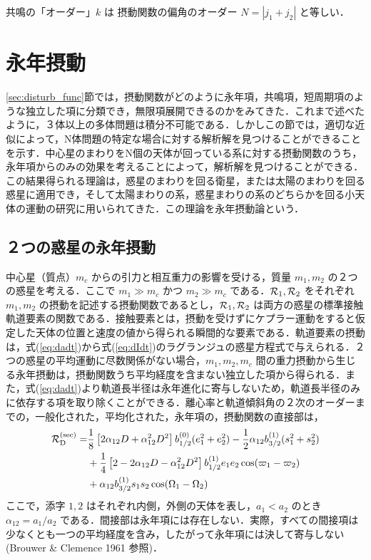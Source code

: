 \documentclass[11pt,a4paper,oneside,onecolumn]{jreport}
\begin{document}
共鳴の「オーダー」$k$ は 摂動関数の偏角のオーダー $N = |j_1 + j_2|$ と等しい．

\section{永年摂動}
\ref{sec:disturb_func}節では，摂動関数がどのように永年項，共鳴項，短周期項のような独立した項に分類でき，無限項展開できるのかをみてきた．これまで述べたように，３体以上の多体問題は積分不可能である．しかしこの節では，適切な近似によって，N体問題の特定な場合に対する解析解を見つけることができることを示す．中心星のまわりをN個の天体が回っている系に対する摂動関数のうち，永年項からのみの効果を考えることによって，解析解を見つけることができる．この結果得られる理論は，惑星のまわりを回る衛星，または太陽のまわりを回る惑星に適用でき，そして太陽まわりの系，惑星まわりの系のどちらかを回る小天体の運動の研究に用いられてきた．この理論を永年摂動論という．

\subsection{２つの惑星の永年摂動 \label{sec:2planet}}
中心星（質点）$m_c$ からの引力と相互重力の影響を受ける，質量 $m_1, m_2$ の２つの惑星を考える．ここで $m_1 \gg m_c$ かつ $m_2 \gg m_c$ である．${\cal R}_1, {\cal R}_2$ をそれぞれ $m_1, m_2$ の摂動を記述する摂動関数であるとし，${\cal R}_1, {\cal R}_2$ は両方の惑星の標準接触軌道要素の関数である．接触要素とは，摂動を受けずにケプラー運動をすると仮定した天体の位置と速度の値から得られる瞬間的な要素である．軌道要素の摂動は，式(\ref{eq:dadt})から式(\ref{eq:dIdt})のラグランジュの惑星方程式で与えられる．２つの惑星の平均運動に尽数関係がない場合，$m_1, m_2, m_c$ 間の重力摂動から生じる永年摂動は，摂動関数うち平均経度を含まない独立した項から得られる．また，式(\ref{eq:dadt})より軌道長半径は永年進化に寄与しないため，軌道長半径のみに依存する項を取り除くことができる．離心率と軌道傾斜角の２次のオーダーまでの，一般化された，平均化された，永年項の，摂動関数の直接部は，
\begin{equation}
\begin{split}
{\cal R}_{\rm D}^{\rm (sec)} = & \frac{1}{8} \left[ 2 \alpha_{12} D + \alpha_{12}^2 D^2 \right] b_{1/2}^{(0)} (e_1^2 + e_2^2) - \frac{1}{2} \alpha_{12} b_{3/2}^{(1)} (s_1^2 + s_2^2) \\
& + \frac{1}{4} \left[ 2 - 2 \alpha_{12} D - \alpha_{12}^2 D^2 \right] b_{1/2}^{(1)} e_1 e_2 \cos (\varpi_1 - \varpi_2) \\
& + \alpha_{12} b_{3/2}^{(1)} s_1 s_2 \cos (\Omega_1 - \Omega_2) \\
\end{split} \label{}
\end{equation}
ここで，添字 $1,2$ はそれぞれ内側，外側の天体を表し，$a_1 < a_2$ のとき $\alpha_{12} = a_1 / a_2$ 
である．間接部は永年項には存在しない．実際，すべての間接項は少なくとも一つの平均経度を含み，したがって永年項には決して寄与しない (Brouwer \& Clemence 1961 参照)．
\end{document}
